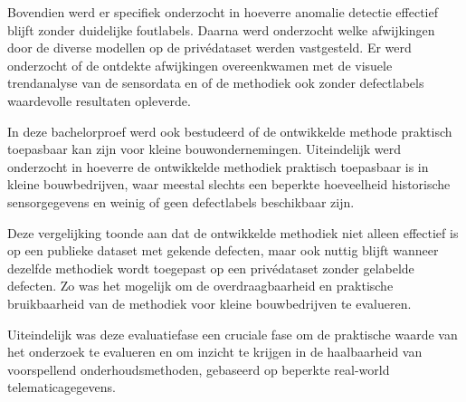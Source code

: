 Bovendien werd er specifiek onderzocht in hoeverre anomalie detectie effectief blijft zonder duidelijke foutlabels. Daarna werd onderzocht welke afwijkingen door de diverse modellen op de privédataset werden vastgesteld. Er werd onderzocht of de ontdekte afwijkingen overeenkwamen met de visuele trendanalyse van de sensordata en of de methodiek ook zonder defectlabels waardevolle resultaten opleverde. 

In deze bachelorproef werd ook bestudeerd of de ontwikkelde methode praktisch toepasbaar kan zijn voor kleine bouwondernemingen. Uiteindelijk werd onderzocht in hoeverre de ontwikkelde methodiek praktisch toepasbaar is in kleine bouwbedrijven, waar meestal slechts een beperkte hoeveelheid historische sensorgegevens en weinig of geen defectlabels beschikbaar zijn.


Deze vergelijking toonde aan dat de ontwikkelde methodiek niet alleen effectief is op een publieke dataset met gekende defecten, maar ook nuttig blijft wanneer dezelfde methodiek wordt toegepast op een privédataset zonder gelabelde defecten. Zo was het mogelijk om de overdraagbaarheid en praktische bruikbaarheid van de methodiek voor kleine bouwbedrijven te evalueren.

Uiteindelijk was deze evaluatiefase een cruciale fase om de praktische waarde van het onderzoek te evalueren en om inzicht te krijgen in de haalbaarheid van voorspellend onderhoudsmethoden, gebaseerd op beperkte real-world telematicagegevens.



